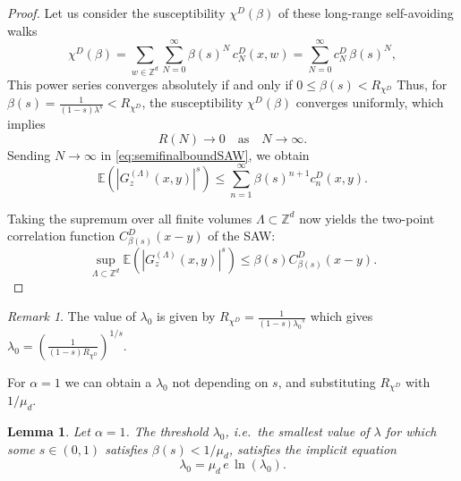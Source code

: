 \documentclass[11pt, a4paper, UKenglish, oneside]{book}
\theoremstyle{plain}
\newtheorem{lemma}[theorem]{Lemma}
\theoremstyle{remark}
\newtheorem{remark}[theorem]{Remark}
\theoremstyle{definition}
\numberwithin{equation}{section}
\numberwithin{theorem}{section}
\begin{document}
\begin{proof}
Let us consider the susceptibility $\chi^D(\beta)$ of these long-range self-avoiding walks
\begin{equation}
    \chi^D(\beta) = \sum_{w \in \mathbb{Z}^d} \sum_{N=0}^{\infty} \beta(s)^N \, c_N^D(x,w) = \sum_{N=0}^\infty c_N^D \, \beta(s)^N,
\end{equation}
This power series converges absolutely if and only if $0 \le \beta(s) < R_{\chi^D}$ 
Thus, for $\beta(s) = \frac{1}{(1-s)\lambda^s} < R_{\chi^D}$, the susceptibility $\chi^D(\beta)$ converges uniformly, which implies 
\[
R(N) \longrightarrow 0 \quad \text{as} \quad N \rightarrow \infty.
\]
Sending $N \to \infty$ in \eqref{eq:semifinalboundSAW}, we obtain
\begin{equation}
    \mathbb{E}\left( |G_z^{(\Lambda)}(x,y)|^s \right) \le \sum_{n=1}^\infty \beta(s)^{n+1} c_n^D(x,y).
\end{equation}

Taking the supremum over all finite volumes $\Lambda \subset \mathbb{Z}^d$ now yields the two-point correlation function $C_{\beta(s)}^D(x-y)$ of the SAW:
\begin{equation}
\sup_{\Lambda \subset \mathbb{Z}^d} \mathbb{E}\left( |G_z^{(\Lambda)}(x,y)|^s \right) \le \beta(s) C_{\beta(s)}^D(x-y). \tag{4.3}
\end{equation}
\end{proof}

\begin{remark}
    The value of $\lambda_0$ is given by $R_{\chi^D}= \frac{1}{(1-s){\lambda_0}^s}$ which gives $\lambda_0 = \left(\frac{1}{(1-s)R_{\chi^D}}\right)^{1/s}$. \\
\end{remark}
For $\alpha =1$ we can obtain a $\lambda_0$ not depending on $s$, and substituting $R_{\chi^D}$ with $1/\mu_d$.
\begin{lemma}\label{lemma:lambda0equation}
Let $\alpha = 1$. The threshold $\lambda_0$, i.e.\ the smallest value of $\lambda$ for which some $s \in (0,1)$ satisfies $\beta(s) < 1/\mu_d$, satisfies the implicit equation
\begin{equation*}
    \lambda_0 = \mu_d \, e \, \ln(\lambda_0).
\end{equation*}
\end{lemma}
 
\end{document}
